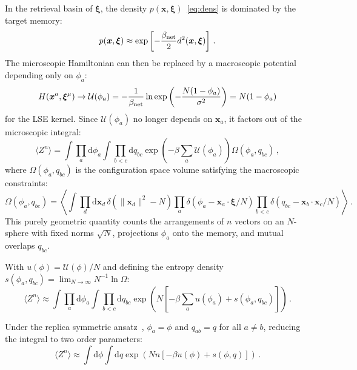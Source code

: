 \documentclass{article}
\newcommand{\dd}{{\mathrm{d}}}
\theoremstyle{plain}
\theoremstyle{definition}
\theoremstyle{remark}
\begin{document}
In the retrieval basin of $\bm{\xi}$, the density $p(\bm{x}, \bm{\xi})$~\eqref{eq:dens} is dominated by the target memory:
\begin{equation}
    p(\bm{x}, \bm{\xi}) \approx \exp\left[ - \frac{\beta_{\rm net}}{2} d^2(\bm{x}, \bm{\xi}) \right] \,.
    \label{eq:dens_red}    
\end{equation}
The microscopic Hamiltonian can then be replaced by a macroscopic potential depending only on $\phi_a$:
\begin{equation}
    H(\bm{x}^a, \bm{\xi}^\mu) \to \mathcal{U}(\phi_a) = -\frac{1}{\beta_{\rm net}} \ln \exp\left( -\frac{N(1 - \phi_a)}{\sigma^2} \right) = N(1-\phi_a)
\end{equation}
for the LSE kernel. Since $\mathcal{U}(\phi_a)$ no longer depends on $\bm{x}_a$, it factors out of the microscopic integral:
\begin{equation}
    \langle Z^n \rangle = \int \prod_a \dd \phi_a \int \prod_{b<c} \dd q_{bc} \exp\left(-\beta \sum_a \mathcal{U}(\phi_a)\right) \Omega(\phi_a, q_{bc})\,,
\end{equation}
where $\Omega(\phi_a, q_{bc})$ is the configuration space volume satisfying the macroscopic constraints:
\begin{equation}
\Omega(\phi_a, q_{bc}) = \left\langle \int \prod_d \dd \bm{x}_d \,\delta(\|\bm{x}_d\|^2 - N) \prod_a \delta(\phi_a - \bm{x}_a \cdot \bm{\xi}/N) \prod_{b<c} \delta(q_{bc} - \bm{x}_b \cdot \bm{x}_c/N) \right\rangle\,.
\end{equation}
This purely geometric quantity counts the arrangements of $n$ vectors on an $N$-sphere with fixed norms $\sqrt{N}$, projections $\phi_a$ onto the memory, and mutual overlaps $q_{bc}$.

With $u(\phi) = \mathcal{U}(\phi)/N$ and defining the entropy density $s(\phi_a, q_{bc}) = \lim_{N \to \infty} N^{-1} \ln \Omega$:
\begin{equation}
    \langle Z^n \rangle \approx \int \prod_a \dd \phi_a \int \prod_{b<c} \dd q_{bc} \exp\left( N \left[ -\beta \sum_a u(\phi_a) + s(\phi_a, q_{bc}) \right] \right)\,.
\end{equation}

Under the replica symmetric ansatz~\citep{amit1987statistical}, $\phi_a = \phi$ and $q_{ab} = q$ for all $a \neq b$, reducing the integral to two order parameters:
\begin{equation}
\langle Z^n \rangle \approx \int \dd \phi \int \dd q \exp \left( N n \left[ -\beta u(\phi) + s(\phi, q) \right] \right)\,.
\end{equation}
\end{document}
